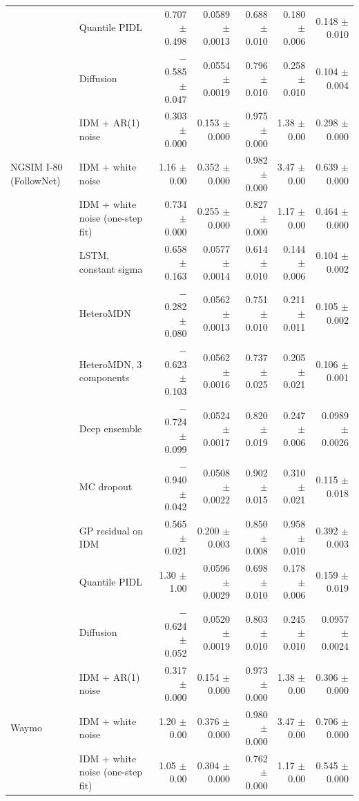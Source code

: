 \begin{longtable}{llrrrrr}
 & Quantile PIDL & 0.707 $\pm$ 0.498 & 0.0589 $\pm$ 0.0013 & 0.688 $\pm$ 0.010 & 0.180 $\pm$ 0.006 & 0.148 $\pm$ 0.010 \\
 & Diffusion & $-$0.585 $\pm$ 0.047 & 0.0554 $\pm$ 0.0019 & 0.796 $\pm$ 0.010 & 0.258 $\pm$ 0.010 & 0.104 $\pm$ 0.004 \\
 & IDM + AR(1) noise & 0.303 $\pm$ 0.000 & 0.153 $\pm$ 0.000 & 0.975 $\pm$ 0.000 & 1.38 $\pm$ 0.00 & 0.298 $\pm$ 0.000 \\
\midrule
NGSIM I-80 (FollowNet) & IDM + white noise & 1.16 $\pm$ 0.00 & 0.352 $\pm$ 0.000 & 0.982 $\pm$ 0.000 & 3.47 $\pm$ 0.00 & 0.639 $\pm$ 0.000 \\
 & IDM + white noise (one-step fit) & 0.734 $\pm$ 0.000 & 0.255 $\pm$ 0.000 & 0.827 $\pm$ 0.000 & 1.17 $\pm$ 0.00 & 0.464 $\pm$ 0.000 \\
 & LSTM, constant sigma & 0.658 $\pm$ 0.163 & 0.0577 $\pm$ 0.0014 & 0.614 $\pm$ 0.010 & 0.144 $\pm$ 0.006 & 0.104 $\pm$ 0.002 \\
 & HeteroMDN & $-$0.282 $\pm$ 0.080 & 0.0562 $\pm$ 0.0013 & 0.751 $\pm$ 0.010 & 0.211 $\pm$ 0.011 & 0.105 $\pm$ 0.002 \\
 & HeteroMDN, 3 components & $-$0.623 $\pm$ 0.103 & 0.0562 $\pm$ 0.0016 & 0.737 $\pm$ 0.025 & 0.205 $\pm$ 0.021 & 0.106 $\pm$ 0.001 \\
 & Deep ensemble & $-$0.724 $\pm$ 0.099 & 0.0524 $\pm$ 0.0017 & 0.820 $\pm$ 0.019 & 0.247 $\pm$ 0.006 & 0.0989 $\pm$ 0.0026 \\
 & MC dropout & $-$0.940 $\pm$ 0.042 & 0.0508 $\pm$ 0.0022 & 0.902 $\pm$ 0.015 & 0.310 $\pm$ 0.021 & 0.115 $\pm$ 0.018 \\
 & GP residual on IDM & 0.565 $\pm$ 0.021 & 0.200 $\pm$ 0.003 & 0.850 $\pm$ 0.008 & 0.958 $\pm$ 0.010 & 0.392 $\pm$ 0.003 \\
 & Quantile PIDL & 1.30 $\pm$ 1.00 & 0.0596 $\pm$ 0.0029 & 0.698 $\pm$ 0.010 & 0.178 $\pm$ 0.006 & 0.159 $\pm$ 0.019 \\
 & Diffusion & $-$0.624 $\pm$ 0.052 & 0.0520 $\pm$ 0.0019 & 0.803 $\pm$ 0.010 & 0.245 $\pm$ 0.010 & 0.0957 $\pm$ 0.0024 \\
 & IDM + AR(1) noise & 0.317 $\pm$ 0.000 & 0.154 $\pm$ 0.000 & 0.973 $\pm$ 0.000 & 1.38 $\pm$ 0.00 & 0.306 $\pm$ 0.000 \\
\midrule
Waymo & IDM + white noise & 1.20 $\pm$ 0.00 & 0.376 $\pm$ 0.000 & 0.980 $\pm$ 0.000 & 3.47 $\pm$ 0.00 & 0.706 $\pm$ 0.000 \\
 & IDM + white noise (one-step fit) & 1.05 $\pm$ 0.00 & 0.304 $\pm$ 0.000 & 0.762 $\pm$ 0.000 & 1.17 $\pm$ 0.00 & 0.545 $\pm$ 0.000 \\

\end{longtable}
